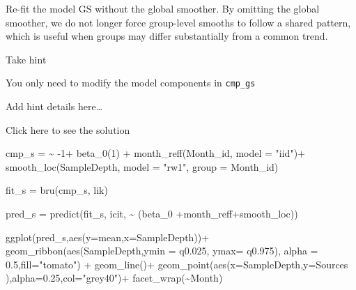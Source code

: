 \documentclass[
  letterpaper,
  DIV=11,
  numbers=noendperiod]{scrartcl}
\newenvironment{Shaded}{\begin{snugshade}}{\end{snugshade}}
\newcommand{\AttributeTok}[1]{\textcolor[rgb]{0.40,0.45,0.13}{#1}}
\newcommand{\DecValTok}[1]{\textcolor[rgb]{0.68,0.00,0.00}{#1}}
\newcommand{\ErrorTok}[1]{\textcolor[rgb]{0.68,0.00,0.00}{#1}}
\newcommand{\FloatTok}[1]{\textcolor[rgb]{0.68,0.00,0.00}{#1}}
\newcommand{\FunctionTok}[1]{\textcolor[rgb]{0.28,0.35,0.67}{#1}}
\newcommand{\NormalTok}[1]{\textcolor[rgb]{0.00,0.23,0.31}{#1}}
\newcommand{\OtherTok}[1]{\textcolor[rgb]{0.00,0.23,0.31}{#1}}
\newcommand{\SpecialCharTok}[1]{\textcolor[rgb]{0.37,0.37,0.37}{#1}}
\newcommand{\StringTok}[1]{\textcolor[rgb]{0.13,0.47,0.30}{#1}}
\begin{document}
\begin{tcolorbox}[enhanced jigsaw, coltitle=black, breakable, colbacktitle=quarto-callout-warning-color!10!white, bottomtitle=1mm, toprule=.15mm, colframe=quarto-callout-warning-color-frame, rightrule=.15mm, title={Task}, arc=.35mm, toptitle=1mm, opacityback=0, titlerule=0mm, left=2mm, bottomrule=.15mm, leftrule=.75mm, opacitybacktitle=0.6, colback=white]

Re-fit the model GS without the global smoother. By omitting the global
smoother, we do not longer force group-level smooths to follow a shared
pattern, which is useful when groups may differ substantially from a
common trend.

Take hint

You only need to modify the model components in \texttt{cmp\_gs}

Add hint details here\ldots{}

Click here to see the solution

\begin{Shaded}
\begin{Highlighting}[]
\NormalTok{cmp\_s }\OtherTok{=}  \ErrorTok{\textasciitilde{}} \SpecialCharTok{{-}}\DecValTok{1}\SpecialCharTok{+} \FunctionTok{beta\_0}\NormalTok{(}\DecValTok{1}\NormalTok{) }\SpecialCharTok{+}
  \FunctionTok{month\_reff}\NormalTok{(Month\_id, }\AttributeTok{model =} \StringTok{"iid"}\NormalTok{)}\SpecialCharTok{+}
  \FunctionTok{smooth\_loc}\NormalTok{(SampleDepth, }\AttributeTok{model =} \StringTok{"rw1"}\NormalTok{, }\AttributeTok{group =}\NormalTok{ Month\_id)}

\NormalTok{fit\_s }\OtherTok{=} \FunctionTok{bru}\NormalTok{(cmp\_s, lik) }

\NormalTok{pred\_s }\OtherTok{=} \FunctionTok{predict}\NormalTok{(fit\_s, icit, }\SpecialCharTok{\textasciitilde{}}\NormalTok{ (beta\_0 }\SpecialCharTok{+}\NormalTok{month\_reff}\SpecialCharTok{+}\NormalTok{smooth\_loc))}

\FunctionTok{ggplot}\NormalTok{(pred\_s,}\FunctionTok{aes}\NormalTok{(}\AttributeTok{y=}\NormalTok{mean,}\AttributeTok{x=}\NormalTok{SampleDepth))}\SpecialCharTok{+}
  \FunctionTok{geom\_ribbon}\NormalTok{(}\FunctionTok{aes}\NormalTok{(SampleDepth,}\AttributeTok{ymin =}\NormalTok{ q0}\FloatTok{.025}\NormalTok{, }\AttributeTok{ymax=}\NormalTok{ q0}\FloatTok{.975}\NormalTok{), }\AttributeTok{alpha =} \FloatTok{0.5}\NormalTok{,}\AttributeTok{fill=}\StringTok{"tomato"}\NormalTok{) }\SpecialCharTok{+}
  \FunctionTok{geom\_line}\NormalTok{()}\SpecialCharTok{+}
  \FunctionTok{geom\_point}\NormalTok{(}\FunctionTok{aes}\NormalTok{(}\AttributeTok{x=}\NormalTok{SampleDepth,}\AttributeTok{y=}\NormalTok{Sources ),}\AttributeTok{alpha=}\FloatTok{0.25}\NormalTok{,}\AttributeTok{col=}\StringTok{"grey40"}\NormalTok{)}\SpecialCharTok{+}
  \FunctionTok{facet\_wrap}\NormalTok{(}\SpecialCharTok{\textasciitilde{}}\NormalTok{Month)}
\end{Highlighting}
\end{Shaded}


\end{tcolorbox}
\end{document}
